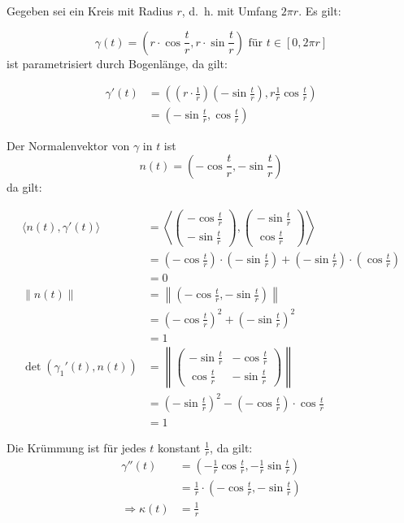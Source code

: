 \begin{beispiel}%
    Gegeben sei ein Kreis mit Radius $r$, d.~h. mit Umfang $2\pi r$.
    Es gilt:

    \[\gamma(t) = \left (r \cdot \cos \frac{t}{r}, r \cdot \sin \frac{t}{r} \right ) \text{ für } t \in [0, 2\pi r]\]
    ist parametrisiert durch Bogenlänge, da gilt:

    \begin{align*}
        \gamma'(t)  &= \left ((r \cdot \frac{1}{r}) (- \sin \frac{t}{r}), r \frac{1}{r} \cos \frac{t}{r} \right )\\
                    &= \left (- \sin \frac{t}{r}, \cos \frac{t}{r} \right )
    \end{align*}

    Der Normalenvektor von $\gamma$ in $t$ ist
    \[n(t) = \left (- \cos \frac{t}{r}, - \sin \frac{t}{r} \right )\]
    da gilt:

    \begin{align*}
        \langle n(t), \gamma'(t) \rangle &=
        \left \langle
            \begin{pmatrix}- \cos \frac{t}{r}\\ - \sin \frac{t}{r}\end{pmatrix},
            \begin{pmatrix}- \sin \frac{t}{r}\\ \cos \frac{t}{r}\end{pmatrix}
        \right \rangle\\
        &= (- \cos \frac{t}{r}) \cdot (- \sin \frac{t}{r}) + (- \sin \frac{t}{r}) \cdot (\cos \frac{t}{r})\\
        &= 0\\
        \|n(t)\| &= \left \| (- \cos \frac{t}{r}, - \sin \frac{t}{r}) \right \|\\
        &=(- \cos \frac{t}{r})^2 + (- \sin \frac{t}{r})^2\\
        &= 1\\
        \det(\gamma_1'(t), n(t)) &= \left \|
            \begin{pmatrix}
                - \sin \frac{t}{r} & - \cos \frac{t}{r}\\
                  \cos \frac{t}{r} & - \sin \frac{t}{r}
            \end{pmatrix}
        \right \|\\
        &= (- \sin \frac{t}{r})^2 - (- \cos \frac{t}{r}) \cdot \cos \frac{t}{r}\\
        &= 1
    \end{align*}

    Die Krümmung ist für jedes $t$ konstant $\frac{1}{r}$, da gilt:
    \begin{align*}
        \gamma''(t) &= \left (- \frac{1}{r} \cos \frac{t}{r}, - \frac{1}{r} \sin \frac{t}{r} \right )\\
                    &= \frac{1}{r} \cdot \left (- \cos \frac{t}{r}, - \sin \frac{t}{r} \right )\\
        \Rightarrow \kappa(t) &= \frac{1}{r}
    \end{align*}
\end{beispiel}

